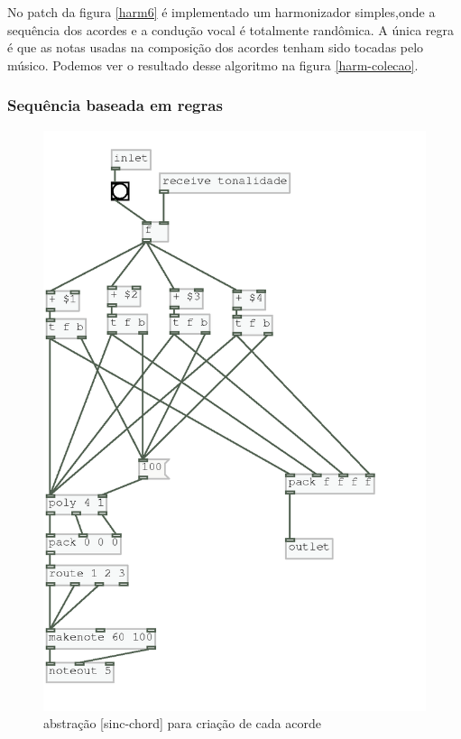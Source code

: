 \documentclass{ppgmus}
\begin{document}
No patch da figura \ref{harm6} é implementado um harmonizador simples,onde a sequência dos acordes e
a condução vocal é totalmente randômica. A única regra é que as notas usadas na composição
dos acordes tenham sido tocadas pelo músico. Podemos ver o resultado desse algoritmo na figura \ref{harm-colecao}.

\subsubsection{Sequência baseada em regras}


\begin{figure}
\includegraphics[scale=.6]{sinc-chord}
\caption{abstração [sinc-chord] para criação de cada acorde }
\label{sinc-chord}
\end{figure}
\end{document}
